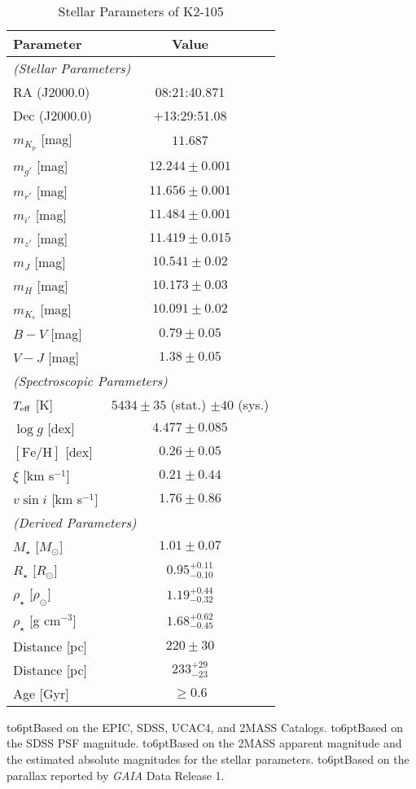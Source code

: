 \documentclass[]{pasj01}
\begin{document}
\begin{table}[tp]
\caption{Stellar Parameters of K2-105}\label{startable}
\begin{tabular}{lc}
\hline
Parameter & Value \\\hline
\multicolumn{2}{l}{\it (Stellar Parameters)\footnotemark[$a$]} \\

RA (J2000.0) & 08:21:40.871 \\
Dec (J2000.0) & +13:29:51.08 \\
$m_{K_p}$ [mag] & $11.687$ \\
$m_{g'}$ [mag] \footnotemark[$b$] & $12.244\pm 0.001$ \\
$m_{r'}$ [mag] \footnotemark[$b$] & $11.656\pm 0.001$ \\
$m_{i'}$ [mag] \footnotemark[$b$] & $11.484\pm 0.001$ \\
$m_{z'}$ [mag] \footnotemark[$b$] & $11.419\pm 0.015$ \\
$m_J$ [mag] & $10.541\pm0.02$ \\
$m_H$ [mag] & $10.173\pm0.03$ \\
$m_{K_\mathrm{s}}$ [mag] & $10.091\pm0.02$ \\
$B-V$ [mag] & $0.79\pm 0.05$ \\
$V-J$ [mag] & $1.38\pm 0.05$ \\ 
\hline
\multicolumn{2}{l}{\it (Spectroscopic Parameters)} \\
$T_{\rm eff}$ [K] & $5434\pm 35$ (stat.) $\pm 40$ (sys.) \\
$\log g$ [dex] & $4.477\pm0.085$\\
$[\mathrm{Fe/H}]$ [dex] & $0.26\pm0.05$ \\
$\xi$ [km s$^{-1}$] & $0.21\pm 0.44$\\
$v \sin i$ [km s$^{-1}$] & $1.76\pm 0.86$\\
\hline
\multicolumn{2}{l}{\it (Derived Parameters)} \\
$M_\star$ [$M_\odot$] & $1.01\pm0.07$ \\
$R_\star$ [$R_\odot$] & $0.95_{-0.10}^{+0.11}$\\
$\rho_\star$ [$\rho_\odot$] & $1.19_{-0.32}^{+0.44}$ \\
$\rho_\star$ [g cm$^{-3}$] & $1.68_{-0.45}^{+0.62}$ \\
Distance [pc] \footnotemark[$c$] & $220 \pm 30$\\
Distance [pc] \footnotemark[$d$] & $233_{-23}^{+29}$ \\
Age [Gyr] & $\geq 0.6$\\
\hline
\end{tabular}
\begin{tabnote}
\noindent
\hbox to6pt{\footnotemark[$a$]\hss}\unskip Based on the EPIC, SDSS, UCAC4, and 2MASS Catalogs.
\hbox to6pt{\footnotemark[$b$]\hss}\unskip Based on the SDSS PSF magnitude.
\hbox to6pt{\footnotemark[$c$]\hss}\unskip Based on the 2MASS apparent magnitude and
the estimated absolute magnitudes for the stellar parameters.
\hbox to6pt{\footnotemark[$d$]\hss}\unskip Based on the parallax reported by {\it GAIA} Data Release 1.
\end{tabnote}
\end{table}
\end{document}
